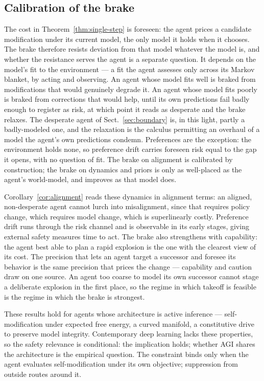 \documentclass[runningheads]{llncs}
\begin{document}
\subsection{Calibration of the brake}
\label{sec:calibration}
The cost in Theorem~\ref{thm:single-step} is foreseen: the agent prices a
candidate modification under its current model, the only model it holds when it
chooses. The brake therefore resists deviation from that model whatever the
model is, and whether the resistance serves the agent is a separate question.
It depends on the model's fit to the environment --- a fit the agent assesses
only across its Markov blanket, by acting and observing. An agent whose model
fits well is braked from modifications that would genuinely degrade it. An agent
whose model fits poorly is braked from corrections that would help, until its
own predictions fail badly enough to register as risk, at which point it reads
as desperate and the brake relaxes. The desperate agent of
Sect.~\ref{sec:boundary} is, in this light, partly a badly-modeled one, and the
relaxation is the calculus permitting an overhaul of a model the agent's own
predictions condemn. Preferences are the exception: the environment holds none,
so preference drift carries foreseen risk equal to the gap it opens, with no
question of fit. The brake on alignment is calibrated by construction; the brake
on dynamics and priors is only as well-placed as the agent's world-model, and
improves as that model does.

Corollary~\ref{cor:alignment} reads these dynamics in alignment terms: an aligned, non-desperate agent cannot lurch into misalignment, since that requires policy change, which requires model change, which is superlinearly costly. Preference drift runs through the risk channel and is observable in its early stages, giving external safety measures time to act. The brake also strengthens with capability: the agent best able to plan a rapid explosion is the one with the clearest view of its cost. The precision that lets an agent target a successor and foresee its behavior is the same precision that prices the change --- capability and caution draw on one source. An agent too coarse to model its own successor cannot stage a deliberate explosion in the first place, so the regime in which takeoff is feasible is the regime in which the brake is strongest.

These results hold for agents whose architecture is active inference --- self-modification under expected free energy, a curved manifold, a constitutive drive to preserve model integrity. Contemporary deep learning lacks these properties, so the safety relevance is conditional: the implication holds; whether AGI shares the architecture is the empirical question. The constraint binds only when the agent evaluates self-modification under its own objective; suppression from outside routes around it.
\end{document}
